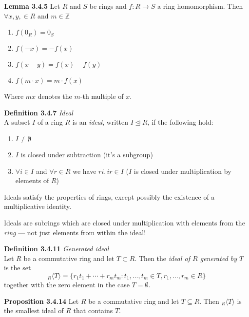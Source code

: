 \documentclass[8pt,landscape]{article}
\begin{document}
\begin{multicols}{3}

    \textbf{Lemma 3.4.5}
    Let $R$ and $S$ be rings and $f : R \to S$ a ring homomorphism.
    Then $\forall x,y, \in R$ and $m \in \mathbb{Z}$
    \begin{enumerate}
        \item $f(0_R)       = 0_S$
        \item $f(-x)        = -f(x)$
        \item $f(x-y)       = f(x) - f(y)$
        \item $f(m \cdot x) = m\cdot f(x)$
    \end{enumerate}
    Where $mx$ denotes the $m$-th multiple of $x$.

    \textbf{Definition 3.4.7} \emph{Ideal} \\
    A subset $I$ of a ring $R$ is an \emph{ideal}, written $I \trianglelefteq R$,
    if the following hold:
    \begin{enumerate}
        \item $I \neq \emptyset$
        \item $I$ is closed under subtraction (it's a subgroup)
        \item $\forall i \in I$ and $\forall r \in R$ we have $ri, ir \in I$
            ($I$ is closed under multiplication by elements of $R$)
    \end{enumerate}
    Ideals satisfy the properties of rings, except possibly the existence of a
    multiplicative identity.

    Ideals are subrings which are closed under multiplication with elements from the
    \emph{ring} --- not just elements from within the ideal!

    \textbf{Definition 3.4.11} \emph{Generated ideal} \\
    Let $R$ be a commutative ring and let $T \subset R$.
    Then the \emph{ideal of $R$ generated by $T$} is the set
    \[
        _R\langle T \rangle = \{ {r_1}{t_1} + \cdots + {r_m}{t_m} : t_1, \ldots,
        t_m \in T, r_1, \ldots, r_m \in R \}
    \]
    together with the zero element in the case $T = \emptyset$.

    \textbf{Proposition 3.4.14}
    Let $R$ be a commutative ring and let $T \subseteq R$.
    Then $_R \langle T \rangle$ is the smallest ideal of $R$ that contains $T$.


\end{multicols}
\end{document}
